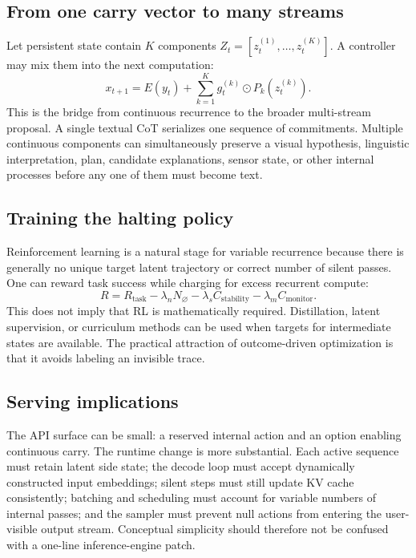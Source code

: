 \documentclass[10pt,twocolumn]{article}
\begin{document}
\subsection{From one carry vector to many streams}

Let persistent state contain $K$ components $Z_t=[z_t^{(1)},\ldots,z_t^{(K)}]$. A controller may mix them into the next computation:
\begin{equation}
 x_{t+1}=E(y_t)+\sum_{k=1}^{K}g_t^{(k)}\odot P_k(z_t^{(k)}).
 \label{eq:multimix}
\end{equation}
This is the bridge from continuous recurrence to the broader multi-stream proposal. A single textual CoT serializes one sequence of commitments. Multiple continuous components can simultaneously preserve a visual hypothesis, linguistic interpretation, plan, candidate explanations, sensor state, or other internal processes before any one of them must become text.

\subsection{Training the halting policy}

Reinforcement learning is a natural stage for variable recurrence because there is generally no unique target latent trajectory or correct number of silent passes. One can reward task success while charging for excess recurrent compute:
\begin{equation}
 R = R_{\mathrm{task}} - \lambda_n N_{\varnothing} - \lambda_s C_{\mathrm{stability}} - \lambda_m C_{\mathrm{monitor}}.
\end{equation}
This does not imply that RL is mathematically required. Distillation, latent supervision, or curriculum methods can be used when targets for intermediate states are available. The practical attraction of outcome-driven optimization is that it avoids labeling an invisible trace.

\subsection{Serving implications}

The API surface can be small: a reserved internal action and an option enabling continuous carry. The runtime change is more substantial. Each active sequence must retain latent side state; the decode loop must accept dynamically constructed input embeddings; silent steps must still update KV cache consistently; batching and scheduling must account for variable numbers of internal passes; and the sampler must prevent null actions from entering the user-visible output stream. Conceptual simplicity should therefore not be confused with a one-line inference-engine patch.
\end{document}
